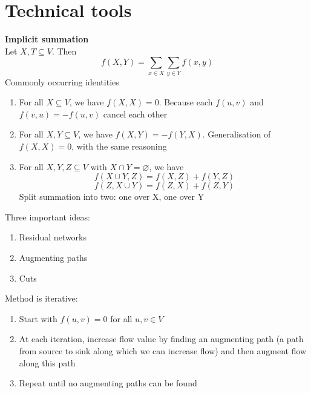 \documentclass{article}[18pt]
\begin{document}
\section{Technical tools}
\textbf{Implicit summation}\\
Let $X,T\subseteq V$. Then
\[
f(X, Y)=\sum_{x \in X} \sum_{y \in Y} f(x, y)
\]
Commonly occurring identities
\begin{enumerate}
	\item For all $X\subseteq V$, we have $f(X,X)=0$. Because each $f(u,v)$ and $f(v,u)=-f(u,v)$ cancel each other
	\item For all $X,Y\subseteq V$, we have $f(X,Y)=-f(Y,X)$. Generalisation of $f(X,X)=0$, with the same reasoning
	\item For all $X,Y,Z\subseteq V$ with $X\cap Y=\varnothing$, we have
	$$f(X\cup Y, Z)=f(X,Z)+f(Y,Z)$$
	$$f(Z,X\cup Y) = f(Z,X) + f(Z,Y)$$
	Split summation into two: one over X, one over Y
\end{enumerate}
Three important ideas:
\begin{enumerate}
	\item Residual networks
	\item Augmenting paths
	\item Cuts
\end{enumerate}
Method is iterative:
\begin{enumerate}
	\item Start with $f(u,v)=0$ for all $u,v\in V$
	\item At each iteration, increase flow value by finding an augmenting path (a path from source to sink along which we can increase flow) and then augment flow along this path
	\item Repeat until no augmenting paths can be found
\end{enumerate}
\end{document}
